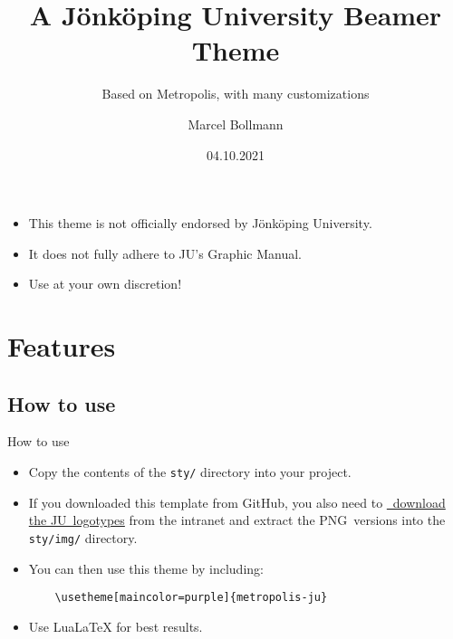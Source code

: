 \documentclass[10pt]{beamer}
\title[JU Beamer Theme]{A Jönköping University Beamer Theme}
\subtitle{Based on Metropolis, with many customizations}
\author{Marcel Bollmann}
\date{04.10.2021}
\institute{%
\hypersetup{urlcolor=.}
\makebox[2.2ex][c]{\faEnvelope}\enspace\href{mailto:marcel.bollmann@ju.se}{\texttt{marcel.bollmann@ju.se}}\\%
\makebox[2.2ex][c]{\faHome}\enspace\url{https://marcel.bollmann.me/}%
}
\begin{document}
\maketitle

\begin{frame}[stretch=3]



  \begin{itemize}
    \item This theme is \alert{not officially endorsed} by Jönköping University.
    \item It does \alert{not fully adhere} to JU's Graphic Manual.
    \item Use at your own discretion!
  \end{itemize}
\end{frame}

\begin{frame}
\centering
{}
\twocol{\tableofcontents[sections={1-2}]}{\tableofcontents[sections={3-5}]}

\end{frame}


\section{Features}
\subsection{How to use}

\begin{frame}[fragile,stretch=3]{How to use}
  \begin{itemize}
    \item Copy the contents of the \texttt{sty/} directory into your project.
  
    \item If you downloaded this template from GitHub, you also need to \href{https://intranet.hj.se/intranet/en/service-and-support/marketing-and-communication/graphic-profile/logotypes.html}{{\small\faExternalLink*}~download the JU~logotypes} from the intranet and extract the PNG~versions into the \texttt{sty/img/} directory.
  
    \item You can then use this theme by including:\medskip
  
    \begin{verbatim}
    \usetheme[maincolor=purple]{metropolis-ju}
    \end{verbatim}
    
    \medskip
    \item \alert{Use LuaLaTeX for best results.}
  \end{itemize}
\end{frame}
\end{document}
